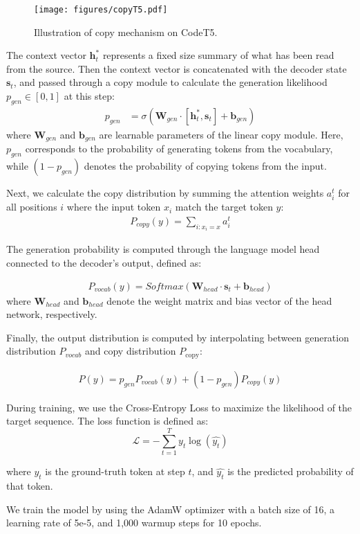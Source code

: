 \begin{figure}
    \centering
    \texttt{[image: figures/copyT5.pdf]}
    \caption{Illustration of copy mechanism on CodeT5.}
    \label{fig:copyT5}
    \vspace{-0.6cm}
\end{figure}

The context vector $\textbf{h}_t^*$ represents a fixed size summary of what has been read from the source. Then the context vector is concatenated with the decoder state $\textbf{s}_t$, and passed through a copy module to calculate the generation likelihood $p_{gen} \in [0,1]$ at this step:
\begin{align}
    p_{gen} &= \sigma(\textbf{W}_{gen} \cdot [\textbf{h}_t^*, \textbf{s}_t] +\textbf{b}_{gen})
\end{align}
where $\textbf{W}_{gen}$ and $\textbf{b}_{gen}$ are learnable parameters of the linear copy module. Here, $p_{gen}$ corresponds to the probability of generating tokens from the vocabulary, while $(1-p_{gen})$ denotes the probability of copying tokens from the input.

Next, we calculate the copy distribution by summing the attention weights $a_i^t$ for all positions $i$ where the input token $x_i$ match the target token $y$:
\begin{align}
P_{copy}(y)=\sum_{i: x_i=x} a_i^t
\end{align}

The generation probability is computed through the language model head connected to the decoder’s output, defined as:

\begin{align}
P_{vocab}(y)=Softmax(\textbf{W}_{head} \cdot \textbf{s}_t +\textbf{b}_{head})
\end{align}
where $\textbf{W}_{head}$ and $\textbf{b}_{head}$ denote the weight matrix and bias vector of the head network, respectively.

Finally, the output distribution is computed by interpolating between generation distribution $P_{vocab}$ and copy distribution $P_{\text{copy}}$:

\begin{align}
P(y) = p_{gen}P_{vocab}(y)+(1-p_{gen})P_{copy}(y)
\end{align}

During training, we use the Cross-Entropy Loss to maximize the likelihood of the target sequence. The loss function is defined as:
\begin{equation}
\mathcal{L} = - \sum_{t=1}^{T}y_t \log(\hat{y_t})
\end{equation}

\noindent where $y_t$ is the ground-truth token at step $t$, and $\hat{y_t}$ is the predicted probability of that token. 

We train the model by using the AdamW optimizer with a batch size of 16, a learning rate of 5e-5, and 1,000 warmup steps for 10 epochs.


